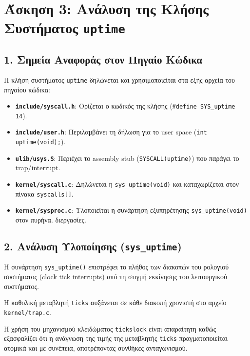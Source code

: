 \documentclass[11pt,a4paper]{article}
\begin{document}
\clearpage

\section{Άσκηση 3: Ανάλυση της Κλήσης Συστήματος \texttt{uptime}}

\subsection*{1. Σημεία Αναφοράς στον Πηγαίο Κώδικα}
Η κλήση συστήματος \texttt{uptime} δηλώνεται και χρησιμοποιείται στα εξής αρχεία του πηγαίου κώδικα:
\begin{itemize}
    \item \textbf{\texttt{include/syscall.h}}: Ορίζεται ο κωδικός της κλήσης (\texttt{\#define SYS\_uptime 14}).
    \item \textbf{\texttt{include/user.h}}: Περιλαμβάνει τη δήλωση για το user space (\texttt{int uptime(void);}).
    \item \textbf{\texttt{ulib/usys.S}}: Περιέχει το assembly stub (\texttt{SYSCALL(uptime)}) που παράγει το trap/interrupt.
    \item \textbf{\texttt{kernel/syscall.c}}: Δηλώνεται η \texttt{sys\_uptime(void)} και καταχωρίζεται στον πίνακα \texttt{syscalls[]}.
    \item \textbf{\texttt{kernel/sysproc.c}}: Υλοποιείται η συνάρτηση εξυπηρέτησης \texttt{sys\_uptime(void)} στον πυρήνα.
    διεργασίες.
\end{itemize}

\subsection*{2. Ανάλυση Υλοποίησης (\texttt{sys\_uptime})}
Η συνάρτηση \texttt{sys\_uptime()} επιστρέφει το πλήθος των διακοπών του ρολογιού συστήματος (clock tick interrupts) 
από τη στιγμή εκκίνησης του λειτουργικού συστήματος. 

Η καθολική μεταβλητή \texttt{ticks} αυξάνεται σε κάθε διακοπή χρονιστή στο αρχείο \texttt{kernel/trap.c}.

Η χρήση του μηχανισμού κλειδώματος \texttt{tickslock} είναι απαραίτητη καθώς 
εξασφαλίζει ότι η ανάγνωση της τιμής της μεταβλητής \texttt{ticks} πραγματοποιείται ατομικά και με συνέπεια, 
αποτρέποντας συνθήκες ανταγωνισμού.
\end{document}
